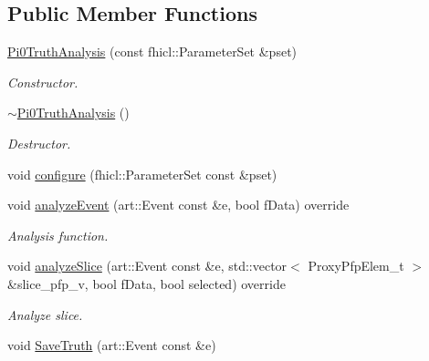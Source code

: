 \subsection*{Public Member Functions}
\begin{DoxyCompactItemize}
\item 
\hyperlink{classanalysis_1_1Pi0TruthAnalysis_ad58bc9cafaa153ef9c775b505d00f5ef}{Pi0\+Truth\+Analysis} (const fhicl\+::\+Parameter\+Set \&pset)
\begin{DoxyCompactList}\small\item\em Constructor. \end{DoxyCompactList}\item 
\hyperlink{classanalysis_1_1Pi0TruthAnalysis_aacb1da6bc05c5af7d13e6699c1b9112d}{$\sim$\+Pi0\+Truth\+Analysis} ()\hypertarget{classanalysis_1_1Pi0TruthAnalysis_aacb1da6bc05c5af7d13e6699c1b9112d}{}\label{classanalysis_1_1Pi0TruthAnalysis_aacb1da6bc05c5af7d13e6699c1b9112d}

\begin{DoxyCompactList}\small\item\em Destructor. \end{DoxyCompactList}\item 
void \hyperlink{classanalysis_1_1Pi0TruthAnalysis_abbbb2436e35ba1e3bc64c4fd4e07668c}{configure} (fhicl\+::\+Parameter\+Set const \&pset)
\item 
void \hyperlink{classanalysis_1_1Pi0TruthAnalysis_a07cf437c5f9d2b19b7a0ca3de447d12f}{analyze\+Event} (art\+::\+Event const \&e, bool f\+Data) override
\begin{DoxyCompactList}\small\item\em Analysis function. \end{DoxyCompactList}\item 
void \hyperlink{classanalysis_1_1Pi0TruthAnalysis_a02b3f2e32b0e8097c0432bd013c0dbe1}{analyze\+Slice} (art\+::\+Event const \&e, std\+::vector$<$ Proxy\+Pfp\+Elem\+\_\+t $>$ \&slice\+\_\+pfp\+\_\+v, bool f\+Data, bool selected) override\hypertarget{classanalysis_1_1Pi0TruthAnalysis_a02b3f2e32b0e8097c0432bd013c0dbe1}{}\label{classanalysis_1_1Pi0TruthAnalysis_a02b3f2e32b0e8097c0432bd013c0dbe1}

\begin{DoxyCompactList}\small\item\em Analyze slice. \end{DoxyCompactList}\item 
void \hyperlink{classanalysis_1_1Pi0TruthAnalysis_adf40bf270a043c1eb7837460bf0e2fc5}{Save\+Truth} (art\+::\+Event const \&e)\hypertarget{classanalysis_1_1Pi0TruthAnalysis_adf40bf270a043c1eb7837460bf0e2fc5}{}\label{classanalysis_1_1Pi0TruthAnalysis_adf40bf270a043c1eb7837460bf0e2fc5}


\end{DoxyCompactItemize}
